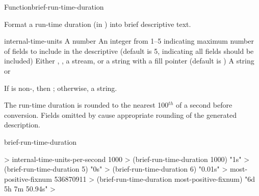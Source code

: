 \documentclass[10pt,twoside,english,pdftex]{article}
\begin{document}
\begin{functiondoc}{Function}{brief-run-time-duration}{%
      
    \returns{} }
% 
% 

\fnsyntax

\fnpurpose Format a run-time duration (in )
into brief descriptive text.

\fnpackage {}

\fnmodule {}

\fnargs
\begin{args}{internal-time-units}
 A number
 An integer from 1--5 indicating maximum number of fields 
to include in the descriptive  (default is 5, indicating all 
fields should be included)
\arg[destination] Either \nil, , a stream, or a string with a fill 
pointer (default is \nil)
\arg[result] A string or \nil{}
\end{args}

\fnreturns If  is non-\nil, then \nil; otherwise, a string.

\fndescription The  run-time duration is rounded to
the nearest 100$^{th}$ of a second before conversion. Fields omitted by
 cause appropriate rounding of the generated
description.

\begin{alsos}{brief-run-time-duration}
\end{alsos}

\fnexamples
%
\W\supp
\begin{example}
  > internal-time-units-per-second
  1000
  > (brief-run-time-duration 1000)
  "1s"
  > (brief-run-time-duration 5)
  "0s"
  > (brief-run-time-duration 6)
  "0.01s"
  > most-positive-fixnum
  536870911
  > (brief-run-time-duration most-positive-fixnum)
  "6d 5h 7m 50.94s"
  >
\end{example}

\end{functiondoc}

\end{document}
